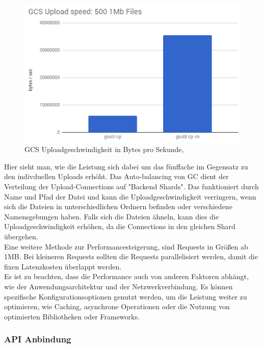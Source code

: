 \begin{figure}[!h]
	\centering
	\includegraphics[width=12cm,keepaspectratio]{Pictures/cloud-storage-performance.png}
	\caption{GCS Uploadgeschwindigkeit in Bytes pro Sekunde, }
\end{figure}

Hier sieht man, wie die Leistung sich dabei um das fünffache im Gegensatz zu den indivduellen Uploads erhöht. Das Auto-balancing von GC dient der Verteilung der Upload-Connections auf "Backend Shards". Das funktioniert durch  Name und Pfad der Datei und kann die Uploadgeschwindigkeit verringern, wenn sich die Dateien in unterschiedlichen Ordnern befinden oder verschiedene Namensgebungen haben. Falls sich die Dateien ähneln, kann dies die Uploadgeschwindigkeit erhöhen, da die Connections in den gleichen Shard übergehen.\\

Eine weitere Methode zur Performancesteigerung, sind Requests in Größen ab 1MB. Bei kleineren Requests sollten die Requests parallelisiert werden, damit die fixen Latenzkosten überlappt werden.\\

Es ist zu beachten, dass die Performance auch von anderen Faktoren abhängt, wie der Anwendungsarchitektur und der Netzwerkverbindung. Es können spezifische Konfigurationsoptionen genutzt werden, um die Leistung weiter zu optimieren, wie Caching, asynchrone Operationen oder die Nutzung von optimierten Bibliotheken oder Frameworks. 

\newpage

\subsubsection{API Anbindung}

